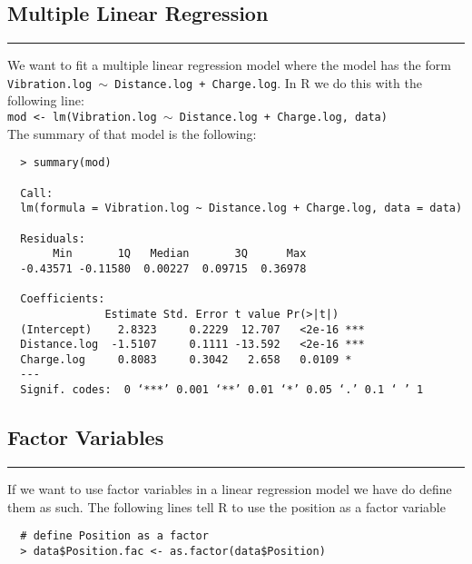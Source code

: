 \subsection{Multiple Linear Regression}
\noindent\rule[\linienAbstand]{\linewidth}{\linienDicke}
We want to fit a multiple linear regression model where the model has the form \texttt{Vibration.log $\sim$ Distance.log + Charge.log}. In R we do this with the following line:\\
\texttt{mod <- lm(Vibration.log $\sim$ Distance.log + Charge.log, data)}\\
The summary of that model is the following:
\begingroup
\scriptsize
\begin{verbatim}
  > summary(mod)

  Call:
  lm(formula = Vibration.log ~ Distance.log + Charge.log, data = data)

  Residuals:
       Min       1Q   Median       3Q      Max
  -0.43571 -0.11580  0.00227  0.09715  0.36978

  Coefficients:
               Estimate Std. Error t value Pr(>|t|)
  (Intercept)    2.8323     0.2229  12.707   <2e-16 ***
  Distance.log  -1.5107     0.1111 -13.592   <2e-16 ***
  Charge.log     0.8083     0.3042   2.658   0.0109 *
  ---
  Signif. codes:  0 ‘***’ 0.001 ‘**’ 0.01 ‘*’ 0.05 ‘.’ 0.1 ‘ ’ 1

\end{verbatim}
\endgroup

\subsection{Factor Variables}
\noindent\rule[\linienAbstand]{\linewidth}{\linienDicke}
If we want to use factor variables in a linear regression model we have do define them as such. The following lines tell R to use the position as a factor variable
\begingroup
\scriptsize
\begin{verbatim}
  # define Position as a factor
  > data$Position.fac <- as.factor(data$Position)
\end{verbatim}
\endgroup

